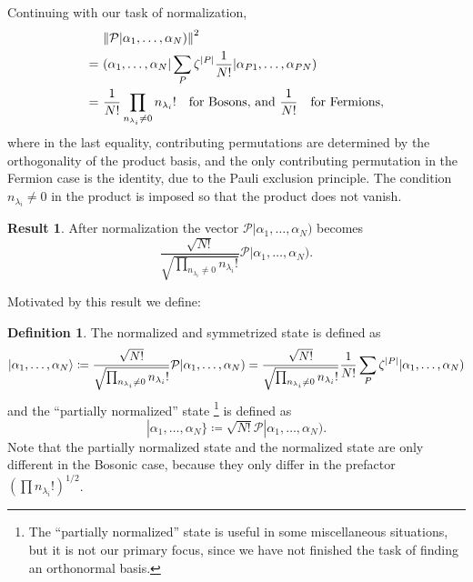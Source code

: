 \documentclass{article}
\theoremstyle{definition}
\newtheorem{res}[mot]{Result}
\newtheorem{dfn}[mot]{Definition}
\numberwithin{equation}{section}
\begin{document}
    Continuing with our task of normalization, 
    \begin{align*}
        &\ \norm{\mathcal{P} |\alpha_1, \ldots ,\alpha_{N})}^{2} \\
        =&\ 
        (\alpha_1, \ldots ,\alpha_{N}|
        \sum_{P}\zeta^{\abs{P}} \frac{1}{N!}
        |\alpha_{P1}, \ldots ,\alpha_{PN}) \\
        =&\ 
        \frac{1}{N!} \prod_{n_{\lambda_{i}} \neq 0} n_{\lambda_{i}} ! 
        \quad \text{for Bosons, and } 
        \frac{1}{N!} \quad \text{for Fermions},
    \end{align*}
    where in the last equality, 
    contributing permutations are determined 
    by the orthogonality of the product basis, and 
    the only contributing permutation
    in the Fermion case is the identity, due to
    the Pauli exclusion principle.
    The condition $n_{\lambda_{i}}\neq 0$ in the product 
    is imposed 
    so that the product does not vanish. 

    \begin{graybox}
    \begin{res}
        After normalization the vector 
        $\mathcal{P}|\alpha_1, \ldots ,\alpha_{N})$
        becomes 
        \[
        \frac{\sqrt{N!}}{\sqrt{\prod_{n_{\lambda_{i}}\neq 0}n_{\lambda_{i}}!}}
        \mathcal{P}|\alpha_1, \ldots ,\alpha_{N}).
        \]
    \label{res:normalization-of-scrambled-states}
    \end{res}
    \end{graybox}

    Motivated by this result we define: 

    \begin{dfn}
        The normalized and symmetrized state 
        is defined as
        \begin{equation}
            \ket{\alpha_1, \ldots ,\alpha_{N}}
            \coloneqq
        \frac{\sqrt{N!}}{\sqrt{\prod_{n_{\lambda_{i}}\neq 0}n_{\lambda_{i}}!}}
        \mathcal{P}|\alpha_1, \ldots ,\alpha_{N})
        =
        \frac{\sqrt{N!}}{\sqrt{\prod_{n_{\lambda_{i}}\neq 0}n_{\lambda_{i}}!}}
        \frac{1}{N!} \sum_{P}\zeta^{\abs{P}}
        |\alpha_1, \ldots ,\alpha_{N})
        \end{equation}
        and the ``partially normalized'' state 
        \footnote{
        The ``partially normalized'' state is useful in some 
        miscellaneous situations, but it is not our primary focus, since 
        we have not finished the task of finding an orthonormal basis. 
        }
        is defined as
        \begin{equation}
            |\alpha_1, \ldots ,\alpha_{N}\}
            \coloneqq
            \sqrt{N!} \mathcal{P} |\alpha_1, \ldots ,\alpha_{N}).
        \end{equation}
        Note that the partially normalized state and the normalized state 
        are only different in the Bosonic case, because they only 
        differ in the prefactor $\left( \prod n_{\lambda_{i}}! \right)^{1 /2}$. 
        \label{dfn:normalized-states-and-partially-normalized-states}
    \end{dfn}
\end{document}
